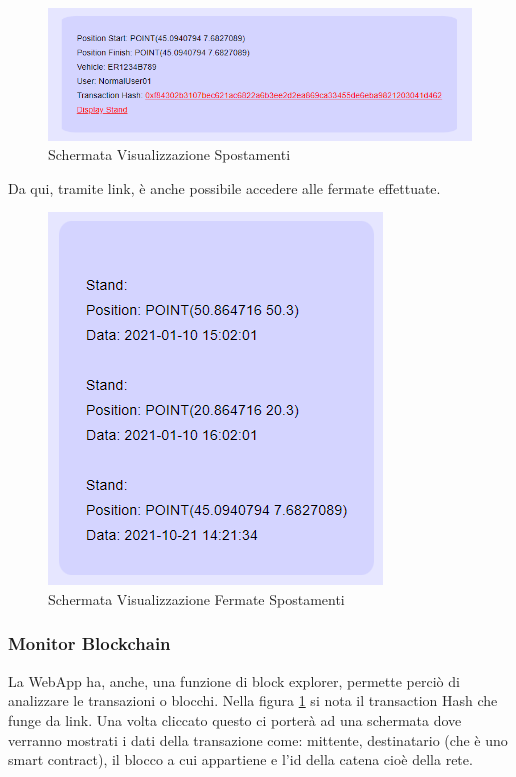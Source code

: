 \documentclass[11pt,a4paper,titlepage, twoside, openright]{report}
\begin{document}
\begin{figure}[h]
	\includegraphics[width=\textwidth]{Log_Print}
	\centering
	\caption{Schermata Visualizzazione Spostamenti}
	\label{fig:Log_Print}
\end{figure}

Da qui, tramite link, è anche possibile accedere alle fermate effettuate.
\begin{figure}[h]
	\includegraphics[height=0.35\textheight]{Stand_Print}
	\centering
	\caption{Schermata Visualizzazione Fermate Spostamenti}
	\label{fig:Log_Stand_Print}
\end{figure}

\subsubsection{Monitor Blockchain}
La WebApp ha, anche, una funzione di block explorer, permette perciò di analizzare le transazioni o blocchi. Nella figura  \ref{fig:Log_Print} si nota il transaction Hash che funge da link. Una volta cliccato questo ci porterà ad una schermata dove verranno mostrati i dati della transazione come: mittente, destinatario (che è uno smart contract), il blocco a cui appartiene e l'id della catena cioè della rete.
\end{document}
